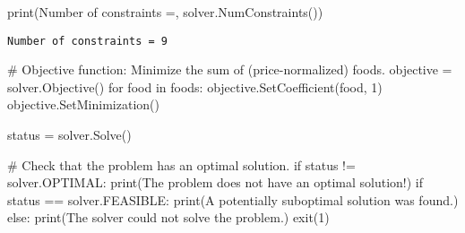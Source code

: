 \documentclass[
  ignorenonframetext,
]{beamer}
\newenvironment{Shaded}{\begin{snugshade}}{\end{snugshade}}
\newcommand{\BuiltInTok}[1]{\textcolor[rgb]{0.00,0.23,0.31}{#1}}
\newcommand{\CommentTok}[1]{\textcolor[rgb]{0.37,0.37,0.37}{#1}}
\newcommand{\ControlFlowTok}[1]{\textcolor[rgb]{0.00,0.23,0.31}{#1}}
\newcommand{\DecValTok}[1]{\textcolor[rgb]{0.68,0.00,0.00}{#1}}
\newcommand{\KeywordTok}[1]{\textcolor[rgb]{0.00,0.23,0.31}{#1}}
\newcommand{\NormalTok}[1]{\textcolor[rgb]{0.00,0.23,0.31}{#1}}
\newcommand{\OperatorTok}[1]{\textcolor[rgb]{0.37,0.37,0.37}{#1}}
\newcommand{\StringTok}[1]{\textcolor[rgb]{0.13,0.47,0.30}{#1}}
\begin{document}
\begin{frame}[fragile]
\begin{Shaded}
\begin{Highlighting}[]
\BuiltInTok{print}\NormalTok{(}\StringTok{\textquotesingle{}Number of constraints =\textquotesingle{}}\NormalTok{, solver.NumConstraints())}
\end{Highlighting}
\end{Shaded}

\begin{verbatim}
Number of constraints = 9
\end{verbatim}

\pause

\begin{Shaded}
\begin{Highlighting}[]
\CommentTok{\# Objective function: Minimize the sum of (price{-}normalized) foods.}
\NormalTok{objective }\OperatorTok{=}\NormalTok{ solver.Objective()}
\ControlFlowTok{for}\NormalTok{ food }\KeywordTok{in}\NormalTok{ foods:}
\NormalTok{    objective.SetCoefficient(food, }\DecValTok{1}\NormalTok{)}
\NormalTok{objective.SetMinimization()}
\end{Highlighting}
\end{Shaded}
\end{frame}

\begin{frame}[fragile]
\begin{Shaded}
\begin{Highlighting}[]
\NormalTok{status }\OperatorTok{=}\NormalTok{ solver.Solve()}

\CommentTok{\# Check that the problem has an optimal solution.}
\ControlFlowTok{if}\NormalTok{ status }\OperatorTok{!=}\NormalTok{ solver.OPTIMAL:}
    \BuiltInTok{print}\NormalTok{(}\StringTok{\textquotesingle{}The problem does not have an optimal solution!\textquotesingle{}}\NormalTok{)}
    \ControlFlowTok{if}\NormalTok{ status }\OperatorTok{==}\NormalTok{ solver.FEASIBLE:}
        \BuiltInTok{print}\NormalTok{(}\StringTok{\textquotesingle{}A potentially suboptimal solution was found.\textquotesingle{}}\NormalTok{)}
    \ControlFlowTok{else}\NormalTok{:}
        \BuiltInTok{print}\NormalTok{(}\StringTok{\textquotesingle{}The solver could not solve the problem.\textquotesingle{}}\NormalTok{)}
\NormalTok{        exit(}\DecValTok{1}\NormalTok{)}
\end{Highlighting}
\end{Shaded}
\end{frame}
\end{document}

